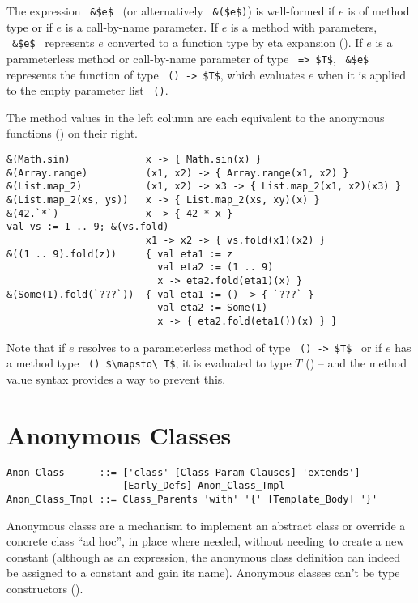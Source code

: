 The expression ~\lstinline!&$e$!~ (or alternatively ~\lstinline!&($e$)!) is well-formed if $e$ is of method type or if $e$ is a call-by-name parameter. If $e$ is a method with parameters, ~\lstinline!&$e$!~ represents $e$ converted to a function type by eta expansion (). If $e$ is a parameterless method or call-by-name parameter of type ~\lstinline!=> $T$!, ~\lstinline!&$e$!~ represents the function of type ~\lstinline!() -> $T$!, which evaluates $e$ when it is applied to the empty parameter list ~\lstinline!()!. 

\example The method values in the left column are each equivalent to the anonymous functions () on their right. 
\begin{lstlisting}[deletekeywords={range}]
&(Math.sin)             x -> { Math.sin(x) }
&(Array.range)          (x1, x2) -> { Array.range(x1, x2) }
&(List.map_2)           (x1, x2) -> x3 -> { List.map_2(x1, x2)(x3) }
&(List.map_2(xs, ys))   x -> { List.map_2(xs, xy)(x) }
&(42.`*`)               x -> { 42 * x }
val vs := 1 .. 9; &(vs.fold)
                        x1 -> x2 -> { vs.fold(x1)(x2) }
&((1 .. 9).fold(z))     { val eta1 := z 
                          val eta2 := (1 .. 9)
                          x -> eta2.fold(eta1)(x) }
&(Some(1).fold(`???`))  { val eta1 := () -> { `???` }
                          val eta2 := Some(1)
                          x -> { eta2.fold(eta1())(x) } }
\end{lstlisting}

Note that if $e$ resolves to a parameterless method of type ~\lstinline!() -> $T$!~ or if $e$ has a method type ~\lstinline!() $\mapsto\ T$!, it is evaluated to type $T$ () -- and the method value syntax provides a way to prevent this. 





\section{Anonymous Classes}
\label{sec:anonymous-classes}

\syntax\begin{lstlisting}
Anon_Class      ::= ['class' [Class_Param_Clauses] 'extends'] 
                    [Early_Defs] Anon_Class_Tmpl
Anon_Class_Tmpl ::= Class_Parents 'with' '{' [Template_Body] '}'
\end{lstlisting}

Anonymous classs are a mechanism to implement an abstract class or override a concrete class ``ad hoc'', in place where needed, without needing to create a new constant (although as an expression, the anonymous class definition can indeed be assigned to a constant and gain its name). Anonymous classes can't be type constructors (). 

